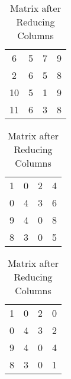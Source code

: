\begin{subquestions}
\begin{subsubquestions}
\begin{table}[!hbt]
	\begin{minipage}{0.3\textwidth}
		\centering
		\begin{tabular}{cccc}
			6 & 5 & 7 & 9 \\
			2 & 6 & 5 & 8 \\
			10 & 5 & 1 & 9 \\
			11 & 6 & 3 & 8 \\
		\end{tabular}
		\captionsetup{width=1.1\linewidth}
		\caption*{Matrix From question}
	\end{minipage}
	\hspace{20pt}
	\begin{minipage}{0.3\textwidth}
		\centering
		\begin{tabular}{cccc}
			1 & 0 & 2 & 4 \\
			0 & 4 & 3 & 6 \\
			9 & 4 & 0 & 8 \\
			8 & 3 & 0 & 5 \\
		\end{tabular}
		\captionsetup{width=1.1\linewidth}
		\caption*{Matrix after Reducing Rows}
	\end{minipage}
	\hspace{20pt}
	\begin{minipage}{0.3\textwidth}
		\centering
		\begin{tabular}{cccc}
			1 & 0 & 2 & 0 \\
			0 & 4 & 3 & 2 \\
			9 & 4 & 0 & 4 \\
			8 & 3 & 0 & 1 \\
		\end{tabular}
		\captionsetup{width=1.1\linewidth}
		\caption*{Matrix after Reducing Columns} 
	\end{minipage}
	

\end{table}
\end{subsubquestions}
\end{subquestions}
